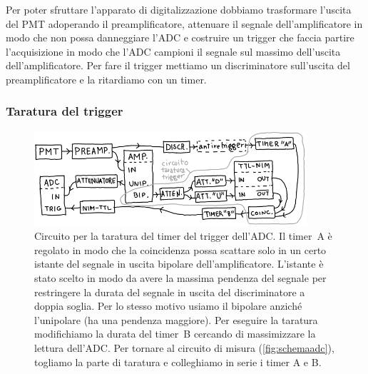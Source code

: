 Per poter sfruttare l'apparato di digitalizzazione dobbiamo trasformare l'uscita del PMT adoperando il preamplificatore,
attenuare il segnale dell'amplificatore in modo che non possa danneggiare l'ADC
e costruire un trigger che faccia partire l'acquisizione
in modo che l'ADC campioni il segnale sul massimo dell'uscita dell'amplificatore.
Per fare il trigger mettiamo un discriminatore sull'uscita del preamplificatore
e la ritardiamo con un timer.

\subsubsection{Taratura del trigger}

\begin{figure}
	\centering
	\includegraphics[width=0.9\textwidth]{schematrig}
	\caption{\label{fig:schematrig}
	Circuito per la taratura del timer del trigger dell'ADC.
	Il timer~A è regolato in modo che la coincidenza possa scattare
	solo in un certo istante del segnale in uscita bipolare dell'amplificatore.
	L'istante è stato scelto in modo da avere la massima pendenza del segnale
	per restringere la durata del segnale in uscita del discriminatore a doppia soglia.
	Per lo stesso motivo usiamo il bipolare anziché l'unipolare (ha una pendenza maggiore).
	Per eseguire la taratura modifichiamo la durata del timer~B
	cercando di massimizzare la lettura dell'ADC.
	Per tornare al circuito di misura (\autoref{fig:schemaadc}),
	togliamo la parte di taratura e colleghiamo in serie i timer A e B.}
\end{figure}

